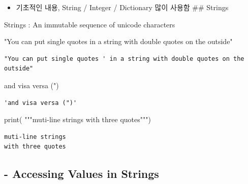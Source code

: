 \documentclass[
  letterpaper,
  DIV=11,
  numbers=noendperiod]{scrreprt}
\newenvironment{Shaded}{\begin{snugshade}}{\end{snugshade}}
\newcommand{\BuiltInTok}[1]{\textcolor[rgb]{0.00,0.23,0.31}{#1}}
\newcommand{\CommentTok}[1]{\textcolor[rgb]{0.37,0.37,0.37}{#1}}
\newcommand{\NormalTok}[1]{\textcolor[rgb]{0.00,0.23,0.31}{#1}}
\newcommand{\StringTok}[1]{\textcolor[rgb]{0.13,0.47,0.30}{#1}}
\providecommand{\tightlist}{%
  \setlength{\itemsep}{0pt}\setlength{\parskip}{0pt}}\usepackage{longtable,booktabs,array}
\begin{document}
\begin{itemize}
\tightlist
\item
  기초적인 내용, String / Integer / Dictionary 많이 사용함 \#\# Strings
\end{itemize}

Strings : An immutable sequence of unicode characters

\begin{Shaded}
\begin{Highlighting}[]
\CommentTok{"You can put single quotes \textquotesingle{} in a string with double quotes on the outside"}
\end{Highlighting}
\end{Shaded}

\begin{verbatim}
"You can put single quotes ' in a string with double quotes on the outside"
\end{verbatim}

\begin{Shaded}
\begin{Highlighting}[]
\CommentTok{\textquotesingle{}and visa versa (")\textquotesingle{}}
\end{Highlighting}
\end{Shaded}

\begin{verbatim}
'and visa versa (")'
\end{verbatim}

\begin{Shaded}
\begin{Highlighting}[]
\BuiltInTok{print}\NormalTok{(}
\StringTok{"""muti{-}line strings}
\StringTok{with three quotes"""}\NormalTok{)}
\end{Highlighting}
\end{Shaded}

\begin{verbatim}
muti-line strings
with three quotes
\end{verbatim}

\subsection{- Accessing Values in
Strings}\label{accessing-values-in-strings}
\end{document}
